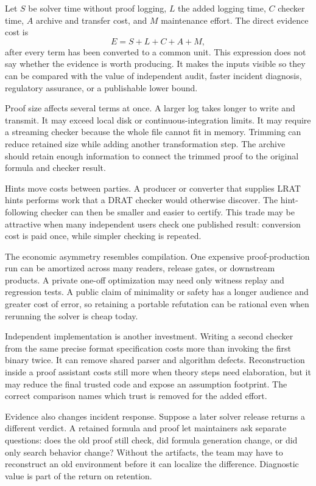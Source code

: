 Let \(S\) be solver time without proof logging, \(L\) the added logging time,
\(C\) checker time, \(A\) archive and transfer cost, and \(M\) maintenance
effort. The direct evidence cost is
\[
  E=S+L+C+A+M,
\]
after every term has been converted to a common unit. This expression does
not say whether the evidence is worth producing. It makes the inputs visible
so they can be compared with the value of independent audit, faster incident
diagnosis, regulatory assurance, or a publishable lower bound.

Proof size affects several terms at once. A larger log takes longer to write
and transmit. It may exceed local disk or continuous-integration limits. It
may require a streaming checker because the whole file cannot fit in memory.
Trimming can reduce retained size while adding another transformation step.
The archive should retain enough information to connect the trimmed proof to
the original formula and checker result.

Hints move costs between parties. A producer or converter that supplies LRAT
hints performs work that a DRAT checker would otherwise discover. The
hint-following checker can then be smaller and easier to certify. This trade
may be attractive when many independent users check one published result:
conversion cost is paid once, while simpler checking is repeated.

The economic asymmetry resembles compilation. One expensive proof-production
run can be amortized across many readers, release gates, or downstream
products. A private one-off optimization may need only witness replay and
regression tests. A public claim of minimality or safety has a longer audience
and greater cost of error, so retaining a portable refutation can be rational
even when rerunning the solver is cheap today.

Independent implementation is another investment. Writing a second checker
from the same precise format specification costs more than invoking the first
binary twice. It can remove shared parser and algorithm defects. Reconstruction
inside a proof assistant costs still more when theory steps need elaboration,
but it may reduce the final trusted code and expose an assumption footprint.
The correct comparison names which trust is removed for the added effort.

Evidence also changes incident response. Suppose a later solver release
returns a different verdict. A retained formula and proof let maintainers ask
separate questions: does the old proof still check, did formula generation
change, or did only search behavior change? Without the artifacts, the team
may have to reconstruct an old environment before it can localize the
difference. Diagnostic value is part of the return on retention.

